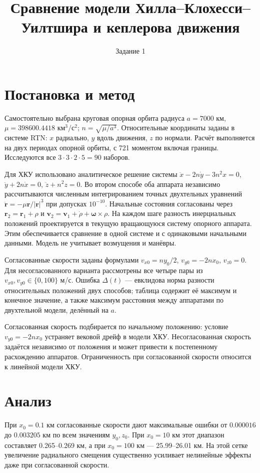 \documentclass[11pt,a4paper]{article}
\title{Сравнение модели Хилла--Клохесси--Уилтшира и кеплерова движения}
\author{Задание 1}
\date{}
\begin{document}
    \maketitle
    \section{Постановка и метод}
    Самостоятельно выбрана круговая опорная орбита радиуса $a=7000$ км, $\mu=398600.4418$
    км$^3$/с$^2$; $n=\sqrt{\mu/a^3}$. Относительные координаты заданы в системе RTN: $x$ радиально,
    $y$ вдоль движения, $z$ по нормали. Расчёт выполняется на двух периодах опорной орбиты, с 721
    моментом включая границы. Исследуются все $3\cdot3\cdot2\cdot5=90$ наборов.

    Для ХКУ использовано аналитическое решение системы $\ddot x-2n\dot y-3n^2x=0$, $\ddot y+2n\dot
    x=0$, $\ddot z+n^2z=0$. Во втором способе оба аппарата независимо рассчитываются численным
    интегрированием точных двухтельных уравнений $\ddot{\mathbf r}=-\mu\mathbf r/|\mathbf r|^3$ при
    допусках $10^{-10}$. Начальные состояния согласованы через $\mathbf r_2=\mathbf r_1+\rho$ и
    $\mathbf v_2=\mathbf v_1+\dot\rho+\boldsymbol\omega\times\rho$. На каждом шаге разность
    инерциальных положений проектируется в текущую вращающуюся систему опорного аппарата. Этим
    обеспечивается сравнение в одной системе и с одинаковыми начальными данными. Модель не учитывает
    возмущения и манёвры.

    Согласованные скорости заданы формулами $v_{x0}=ny_0/2$, $v_{y0}=-2nx_0$, $v_{z0}=0$. Для
    несогласованного варианта рассмотрены все четыре пары из $v_{x0},v_{y0}\in\{0,100\}$ м/с. Ошибка
    $\Delta(t)$ — евклидова норма разности относительных положений двух способов; таблица содержит
    её максимум и конечное значение, а также максимум расстояния между аппаратами по двухтельной
    модели, делённый на $a$.

    Согласованная скорость подбирается по начальному положению: условие $v_{y0}=-2nx_0$ устраняет
    вековой дрейф в модели ХКУ. Несогласованная скорость задаётся независимо от положения и может
    привести к постепенному расхождению аппаратов. Ограниченность при согласованной скорости
    относится к линейной модели ХКУ.

    \section{Анализ}
    При $x_0=0.1$ км согласованные скорости дают максимальные ошибки от $0.000016$ до $0.003205$ км
    по всем значениям $y_0,z_0$. При $x_0=10$ км этот диапазон составляет 0.265--0.269 км, а при
    $x_0=100$ км — 25.99--26.01 км. На этой сетке увеличение радиального смещения существенно
    усиливает нелинейные эффекты даже при согласованной скорости.
\end{document}
